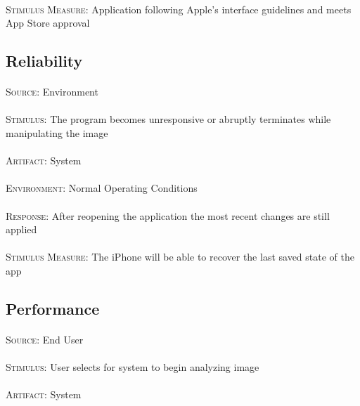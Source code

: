 \paragraph{}\textsc{Stimulus Measure:} Application following Apple's interface guidelines and meets App Store approval

\subsection{Reliability}
\paragraph{}\textsc{Source:} Environment
\paragraph{}\textsc{Stimulus:} The program becomes unresponsive or abruptly terminates while manipulating the image
\paragraph{}\textsc{Artifact:} System
\paragraph{}\textsc{Environment:} Normal Operating Conditions
\paragraph{}\textsc{Response:} After reopening the application the most recent changes are still applied
\paragraph{}\textsc{Stimulus Measure:} The iPhone will be able to recover the last saved state of the app

\subsection{Performance}
\paragraph{}\textsc{Source:} End User
\paragraph{}\textsc{Stimulus:} User selects for system to begin analyzing image
\paragraph{}\textsc{Artifact:} System

